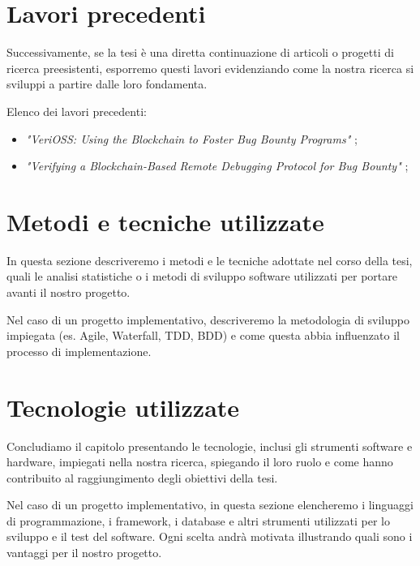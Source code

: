 \section{Lavori precedenti}

Successivamente, se la tesi è una diretta continuazione di articoli o progetti di ricerca preesistenti, esporremo questi lavori evidenziando come la nostra ricerca si sviluppi a partire dalle loro fondamenta.

\medskip

Elenco dei lavori precedenti:

\begin{itemize}

\item \textit{"VeriOSS: Using the Blockchain to Foster Bug Bounty Programs"} \cite{canidio2021verioss};

\item \textit{"Verifying a Blockchain-Based Remote Debugging Protocol for Bug Bounty"} \cite{degano2021verioss};

\end{itemize}


\section{Metodi e tecniche utilizzate}

In questa sezione descriveremo i metodi e le tecniche adottate nel corso della tesi, quali le analisi statistiche o i metodi di sviluppo software utilizzati per portare avanti il nostro progetto.

\medskip

Nel caso di un progetto implementativo, descriveremo la metodologia di sviluppo impiegata (es. Agile, Waterfall, TDD, BDD) e come questa abbia influenzato il processo di implementazione.

\section{Tecnologie utilizzate}

Concludiamo il capitolo presentando le tecnologie, inclusi gli strumenti software e hardware, impiegati nella nostra ricerca, spiegando il loro ruolo e come hanno contribuito al raggiungimento degli obiettivi della tesi.

\medskip

Nel caso di un progetto implementativo, in questa sezione elencheremo i linguaggi di programmazione, i framework, i database e altri strumenti utilizzati per lo sviluppo e il test del software. Ogni scelta andrà motivata illustrando quali sono i vantaggi per il nostro progetto.

